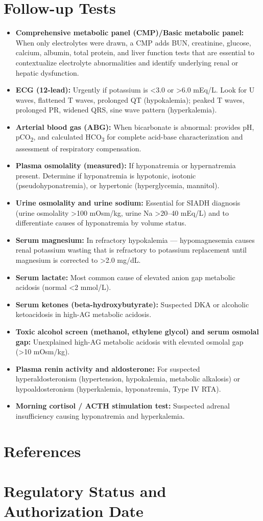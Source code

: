 \section*{Follow-up Tests}
\begin{itemize}
  \item \textbf{Comprehensive metabolic panel (CMP)/Basic metabolic panel:} When only electrolytes were drawn, a CMP adds BUN, creatinine, glucose, calcium, albumin, total protein, and liver function tests that are essential to contextualize electrolyte abnormalities and identify underlying renal or hepatic dysfunction.
  \item \textbf{ECG (12-lead):} Urgently if potassium is <3.0 or >6.0 mEq/L. Look for U waves, flattened T waves, prolonged QT (hypokalemia); peaked T waves, prolonged PR, widened QRS, sine wave pattern (hyperkalemia).
  \item \textbf{Arterial blood gas (ABG):} When bicarbonate is abnormal: provides pH, pCO\textsubscript{2}, and calculated HCO\textsubscript{3} for complete acid-base characterization and assessment of respiratory compensation.
  \item \textbf{Plasma osmolality (measured):} If hyponatremia or hypernatremia present. Determine if hyponatremia is hypotonic, isotonic (pseudohyponatremia), or hypertonic (hyperglycemia, mannitol).
  \item \textbf{Urine osmolality and urine sodium:} Essential for SIADH diagnosis (urine osmolality >100 mOsm/kg, urine Na >20--40 mEq/L) and to differentiate causes of hyponatremia by volume status.
  \item \textbf{Serum magnesium:} In refractory hypokalemia --- hypomagnesemia causes renal potassium wasting that is refractory to potassium replacement until magnesium is corrected to >2.0 mg/dL.
  \item \textbf{Serum lactate:} Most common cause of elevated anion gap metabolic acidosis (normal <2 mmol/L).
  \item \textbf{Serum ketones (beta-hydroxybutyrate):} Suspected DKA or alcoholic ketoacidosis in high-AG metabolic acidosis.
  \item \textbf{Toxic alcohol screen (methanol, ethylene glycol) and serum osmolal gap:} Unexplained high-AG metabolic acidosis with elevated osmolal gap (>10 mOsm/kg).
  \item \textbf{Plasma renin activity and aldosterone:} For suspected hyperaldosteronism (hypertension, hypokalemia, metabolic alkalosis) or hypoaldosteronism (hyperkalemia, hyponatremia, Type IV RTA).
  \item \textbf{Morning cortisol / ACTH stimulation test:} Suspected adrenal insufficiency causing hyponatremia and hyperkalemia.
\end{itemize}

\section*{References}



\clearpage
\section*{Regulatory Status and Authorization Date}

\clearpage
